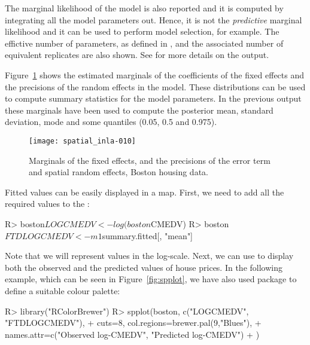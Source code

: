 \documentclass[article]{jss}
\begin{document}
The marginal likelihood of the model is also reported and it is computed by
integrating all the model parameters out. Hence, it is not the {\em predictive}
marginal likelihood and it can be used to perform model selection, for example.
The effictive number of parameters, as defined in
\citet{Spiegelhalteretal:2002}, and the associated number of equivalent
replicates are also shown. See \citet{isi:000284021400008} for more details on
the  output.

Figure~\ref{fig:marg1} shows the estimated marginals of the coefficients
of the fixed effects and the precisions of the
random effects in the model. These distributions can be used to compute summary
statistics for the model parameters. In the previous  output
these marginals have been used to compute the posterior mean, standard 
deviation, mode and some quantiles (0.05, 0.5 and 0.975).


\begin{figure}[h]
\begin{center}
\texttt{[image: spatial\_inla-010]}
\end{center}
\caption{Marginals of the fixed effects, and the precisions of the error term 
and spatial random effects, Boston housing data.}
\label{fig:marg1}
\end{figure}


Fitted values can be easily displayed in a map. First, we need to add
all the required values to the :

\begin{Schunk}
\begin{Sinput}
R> boston$LOGCMEDV <- log(boston$CMEDV)
R> boston$FTDLOGCMEDV <- m1$summary.fitted[, "mean"]
\end{Sinput}
\end{Schunk}
\noindent
Note that we will represent values in the log-scale. 
Next, we can use  to display both the observed and the 
predicted  values of house prices. In the following example, which
can be seen in Figure~\ref{fig:spplot}, we have
also used package  to define a suitable colour palette:
\begin{Schunk}
\begin{Sinput}
R> library("RColorBrewer")
R> spplot(boston, c("LOGCMEDV", "FTDLOGCMEDV"),
+     cuts=8, col.regions=brewer.pal(9,"Blues"),
+     names.attr=c("Observed log-CMEDV", "Predicted log-CMEDV")
+  )
\end{Sinput}
\end{Schunk}
\end{document}
